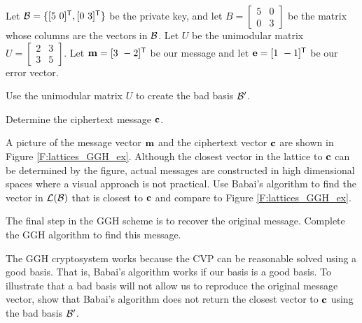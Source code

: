 \begin{pactivity} \label{act:lattices_GGH} Let $\CB = \{[5 \ 0]^{\tr}, [0 \ 3]^{\tr}\}$ be the private key, and let $B = \left[ \begin{array}{cc}5&0\\0&3 \end{array} \right]$ be the matrix whose columns are the vectors in $\mathcal{B}$.  Let $U$ be the unimodular matrix $U = \left[ \begin{array}{cc} 2&3\\3&5 \end{array} \right]$. Let $\mathbf{m} = [3 \ -2]^{\mathsf{T}}$ be our message and let $\mathbf{e} = [1 \ -1]^{\mathsf{T}}$ be our error vector.
\ba
\item Use the unimodular matrix $U$ to create the bad basis $\mathcal{B}'$. 

 
\item Determine the ciphertext message $\mathbf{c}$.


\item A picture of the message vector $\mathbf{m}$ and the ciphertext vector $\mathbf{c}$ are shown in Figure \ref{F:lattices_GGH_ex}. Although the closest vector in the lattice to $\mathbf{c}$ can be determined by the figure, actual messages are constructed in high dimensional spaces where a visual approach is not practical. Use Babai's algorithm to find the vector in $\mathcal{L}(\mathcal{B})$ that is closest to $\mathbf{c}$ and compare to Figure \ref{F:lattices_GGH_ex}.


\item The final step in the GGH scheme is to recover the original message. Complete the GGH algorithm to find this message. 


\item The GGH cryptosystem works because the CVP can be reasonable solved using a good basis. That is, Babai's algorithm works if our basis is a good basis. To illustrate that a bad basis will not allow us to reproduce the original message vector, show that Babai's algorithm does not return the closest vector to $\mathbf{c}$ using the bad basis $\mathcal{B}'$.


\ea

\end{pactivity}

